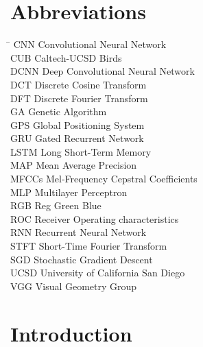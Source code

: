 \chapter*{Abbreviations}
\begin{tabbing}
    \hspace{50mm}\=\kill
    CNN \> Convolutional Neural Network\\
    CUB \> Caltech-UCSD Birds\\
    DCNN \> Deep Convolutional Neural Network\\
    DCT \> Discrete Cosine Transform\\
    DFT \> Discrete Fourier Transform\\
    GA \> Genetic Algorithm\\
    GPS \> Global Positioning System\\
    GRU \> Gated Recurrent Network\\
    LSTM \> Long Short-Term Memory\\
    MAP \> Mean Average Precision\\
    MFCCs \> Mel-Frequency Cepstral Coefficients\\
    MLP \> Multilayer Perceptron\\
    RGB \> Reg Green Blue\\
    ROC \> Receiver Operating characteristics\\
    RNN \> Recurrent Neural Network\\
    STFT \> Short-Time Fourier Transform\\
    SGD \> Stochastic Gradient Descent\\
    UCSD \> University of California San Diego\\
    VGG \> Visual Geometry Group\\
\end{tabbing}
\newpage
{}

\chapter{Introduction}
